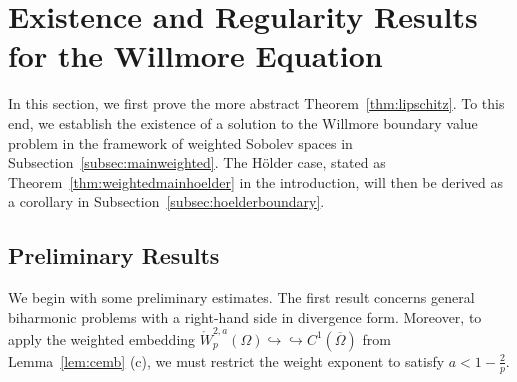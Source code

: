 \documentclass[12pt,a4paper,twoside]{article}
\begin{document}
\section{Existence and Regularity Results for the Willmore Equation}
\label{sec:existencereg}

In this section, we first prove the more abstract Theorem~\ref{thm:lipschitz}. To this end, we establish the existence of a solution to the Willmore boundary value problem in the framework of weighted Sobolev spaces in Subsection~\ref{subsec:mainweighted}. The Hölder case, stated as Theorem~\ref{thm:weightedmainhoelder} in the introduction, will then be derived as a corollary in Subsection~\ref{subsec:hoelderboundary}.

\subsection{Preliminary Results} \label{subsec:prelim}
We begin with some preliminary estimates. The first result concerns general biharmonic problems with a right-hand side in divergence form. Moreover, to apply the weighted embedding $\mathring W^{2,a}_p(\Omega)\hookrightarrow\hookrightarrow C^1(\overline{\Omega})$ from Lemma~\ref{lem:cemb} (c), we must restrict the weight exponent to satisfy $a< 1-\frac{2}{p}$.
\end{document}
